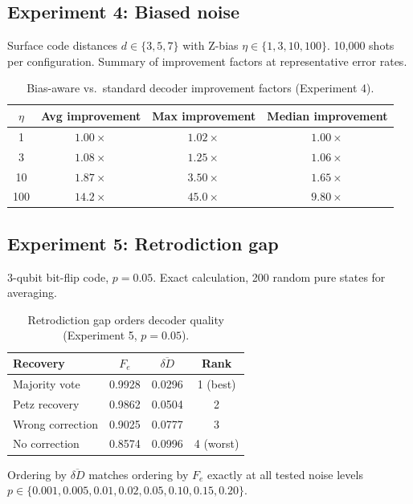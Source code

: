 \documentclass[12pt]{article}
\newcommand{\dd}{\delta\!D}
\begin{document}
\subsection{Experiment 4: Biased noise}

Surface code distances $d \in \{3, 5, 7\}$ with Z-bias $\eta \in \{1, 3, 10, 100\}$. 10,000 shots per configuration. Summary of improvement factors at representative error rates.

\begin{table}[h]
\centering
\caption{Bias-aware vs.\ standard decoder improvement factors (Experiment 4).}
\begin{tabular}{cccc}
\toprule
$\eta$ & Avg improvement & Max improvement & Median improvement \\
\midrule
1 & $1.00\times$ & $1.02\times$ & $1.00\times$ \\
3 & $1.08\times$ & $1.25\times$ & $1.06\times$ \\
10 & $1.87\times$ & $3.50\times$ & $1.65\times$ \\
100 & $14.2\times$ & $45.0\times$ & $9.80\times$ \\
\bottomrule
\end{tabular}
\end{table}

\subsection{Experiment 5: Retrodiction gap}

3-qubit bit-flip code, $p = 0.05$. Exact calculation, 200 random pure states for averaging.

\begin{table}[h]
\centering
\caption{Retrodiction gap orders decoder quality (Experiment 5, $p = 0.05$).}
\begin{tabular}{lccc}
\toprule
Recovery & $F_e$ & $\overline{\dd}$ & Rank \\
\midrule
Majority vote & 0.9928 & 0.0296 & 1 (best) \\
Petz recovery & 0.9862 & 0.0504 & 2 \\
Wrong correction & 0.9025 & 0.0777 & 3 \\
No correction & 0.8574 & 0.0996 & 4 (worst) \\
\bottomrule
\end{tabular}
\end{table}

Ordering by $\overline{\dd}$ matches ordering by $F_e$ exactly at all tested noise levels $p \in \{0.001, 0.005, 0.01, 0.02, 0.05, 0.10, 0.15, 0.20\}$.
\end{document}
